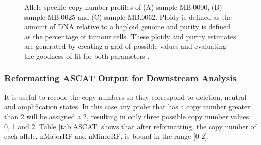 \begin{figure}[!h]
\vspace{0.3cm}
\centering
{}
\vspace{0.8cm}
\vspace{0.8cm}
\caption[Allele-specific copy number profiles of three METABRIC samples.]{Allele-specific copy number profiles of (A) sample MB.0000, (B) sample MB.0025 and (C) sample MB.0062. Ploidy is defined as the amount of DNA relative to a haploid genome and purity is defined as the percentage of tumour cells. These ploidy and purity estimates are generated by creating a grid of possible values and evaluating the goodness-of-fit for both parameters \citep{pmid20837533}.}
\label{fig:s1}
\end{figure}

\subsubsection{Reformatting ASCAT Output for Downstream Analysis}
It is useful to recode the copy numbers so they correspond to deletion, neutral and amplification states. In this case any probe that has a copy number greater than 2 will be assigned a 2, resulting in only three possible copy number values, 0, 1  and 2. Table \ref{tab:ASCAT} shows that after reformatting, the copy number of each allele, nMajorRF and nMinorRF, is bound in the range [0-2]. 

